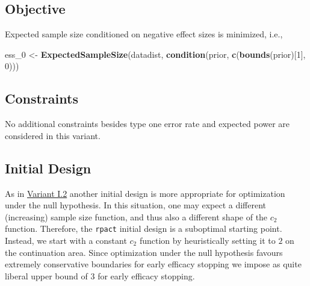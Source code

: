 \documentclass[
]{book}
\newenvironment{Shaded}{\begin{snugshade}}{\end{snugshade}}
\newcommand{\DecValTok}[1]{\textcolor[rgb]{0.00,0.00,0.81}{#1}}
\newcommand{\KeywordTok}[1]{\textcolor[rgb]{0.13,0.29,0.53}{\textbf{#1}}}
\newcommand{\NormalTok}[1]{#1}
\newcommand{\StringTok}[1]{\textcolor[rgb]{0.31,0.60,0.02}{#1}}
\begin{document}
\hypertarget{objective-4}{%
\subsection{Objective}\label{objective-4}}

Expected sample size conditioned on negative effect sizes is minimized, i.e.,

\begin{Shaded}
\begin{Highlighting}[]
\NormalTok{ess_}\DecValTok{0}\NormalTok{ <-}\StringTok{ }\KeywordTok{ExpectedSampleSize}\NormalTok{(datadist, }\KeywordTok{condition}\NormalTok{(prior, }\KeywordTok{c}\NormalTok{(}\KeywordTok{bounds}\NormalTok{(prior)[}\DecValTok{1}\NormalTok{], }\DecValTok{0}\NormalTok{)))}
\end{Highlighting}
\end{Shaded}

\hypertarget{constraints-4}{%
\subsection{Constraints}\label{constraints-4}}

No additional constraints besides type one error rate and expected power
are considered in this variant.

\hypertarget{initial-design-3}{%
\subsection{Initial Design}\label{initial-design-3}}

As in \protect\hyperlink{variantI_2}{Variant I.2} another initial design is more appropriate
for optimization under the null hypothesis.
In this situation, one may expect a different (increasing) sample size function,
and thus also a different shape of the \(c_2\) function.
Therefore, the \texttt{rpact} initial design is a suboptimal starting point.
Instead, we start with a constant \(c_2\) function by heuristically
setting it to \(2\) on the continuation area.
Since optimization under the null hypothesis favours extremely conservative
boundaries for early efficacy stopping we impose as quite liberal upper bound
of \(3\) for early efficacy stopping.
\end{document}

